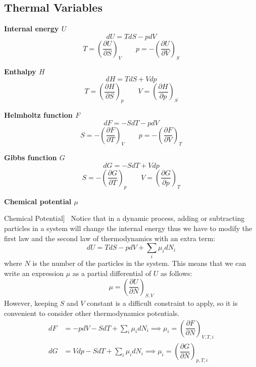 \documentclass[UTF8]{book}
\newenvironment{theorem}[2][Theorem]{\begin{trivlist}
\item[\hskip \labelsep {\bfseries #1}\hskip \labelsep {\bfseries }]}{\end{trivlist}}
\begin{document}
\subsection{Thermal Variables}
\begin{itemize}
\item \textbf{Internal energy $U$}
$$dU=TdS-pdV$$
$$T=\left(\dfrac{\partial U}{\partial S}\right)_V \qquad p=-\left(\dfrac{\partial U}{\partial V}\right)_S$$
\item \textbf{Enthalpy $H$}
$$dH=TdS+Vdp$$
$$T=\left(\dfrac{\partial H}{\partial S}\right)_p \qquad V=\left(\dfrac{\partial H}{\partial p}\right)_S$$
\item \textbf{Helmholtz function $F$}
$$dF=-SdT-pdV$$
$$S=-\left(\dfrac{\partial F}{\partial T}\right)_V \qquad p=-\left(\dfrac{\partial F}{\partial V}\right)_T$$
\item \textbf{Gibbs function $G$}
$$dG=-SdT+Vdp$$
$$S=-\left(\dfrac{\partial G}{\partial T}\right)_p \qquad V=\left(\dfrac{\partial G}{\partial p}\right)_T$$
\item \textbf{Chemical potential $\mu$}
\begin{theorem}
[Chemical Potential]~  {Notice that in a dynamic process, adding or subtracting particles in a system will change the internal energy thus we have to modify the first law and the second law of thermodynamics with an extra term:}
$$dU=TdS-pdV+\sum_i\mu _idN_i$$
 {where $N$ is the number of the particles in the system. This means that we can write an expression $\mu $ as a partial differential of $U$ as follows:}
$$\mu =\left(\dfrac{\partial U}{\partial N}\right)_{S,V}$$
 {However, keeping $S$ and $V$ constant is a difficult constraint to apply, so it is convenient to consider other thermodynamics potentials.}
\begin{align*}
dF&=-pdV-SdT+\sum_i\mu _idN_i \implies \mu _i =\left(\dfrac{\partial F}{\partial N}\right)_{V,T,i}\\
dG&=Vdp-SdT+\sum_i\mu _idN_i \implies \mu _i =\left(\dfrac{\partial G}{\partial N}\right)_{p,T,i}
\end{align*}
\end{theorem}
\end{itemize}
\end{document}
